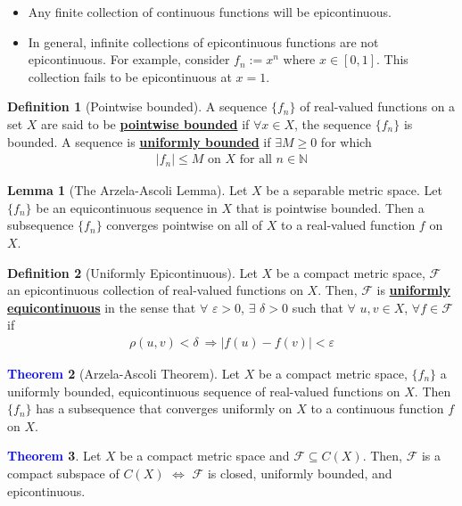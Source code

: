 \documentclass[11pt]{article}
\theoremstyle{definition}
\theoremstyle{definition}
\newcommand{\dfn}[1]{\underline{\textbf{#1}}}
\newtheorem{theorem}{\textcolor{blue}{Theorem}}
\newtheorem{lemma}[theorem]{Lemma}
\theoremstyle{definition}
\newtheorem{definition}{\textcolor{OliveGreen}{Definition}}
\theoremstyle{remark}
\begin{document}
\begin{itemize}[noitemsep]
	\item Any finite collection of continuous functions will be epicontinuous. 
	\item In general, infinite collections of epicontinuous functions are not epicontinuous. For example, consider $f_n := x^n$ where $x \in [0,1]$. This collection fails to be epicontinuous at $x=1$. 
\end{itemize}

\begin{definition}[Pointwise bounded] 
	A sequence $\{ f_n \}$ of real-valued functions on a set $X$ are said to be \dfn{pointwise bounded} if $\forall x \in X$, the sequence $\{ f_n \}$ is bounded. A sequence is \dfn{uniformly bounded} if $\exists M \geq 0$ for which 
	\begin{align*}
		| f_n | \leq M \text{ on } X \text{ for all } n \in \mathbb{N} 
	\end{align*}
\end{definition}

\begin{lemma}[The Arzela-Ascoli Lemma] 
	Let $X$ be a separable metric space. Let $\{ f_n \}$ be an equicontinuous sequence in $X$ that is pointwise bounded. Then a subsequence $\{ f_n \}$ converges pointwise on all of $X$ to a real-valued function $f$ on $X$. 
\end{lemma}

\begin{definition}[Uniformly Epicontinuous]
	Let $X$ be a compact metric space, $\mathcal{F}$ an epicontinuous collection of real-valued functions on $X$. Then, $\mathcal{F}$ is \dfn{uniformly equicontinuous} in the sense that $\forall$ $\varepsilon > 0$, $\exists$ $\delta >0$ such that $\forall $ $u, v \in X$, $\forall f \in \mathcal{F}$ if 
	\begin{align*}
		\rho (u,v) < \delta\ \Rightarrow |f(u) - f(v) | < \varepsilon
	\end{align*}
\end{definition}


\begin{theorem}[Arzela-Ascoli Theorem]
	Let $X$ be a compact metric space, $\{ f_n \}$ a uniformly bounded, equicontinuous sequence of real-valued functions on $X$. Then $\{ f_n \}$ has a subsequence that converges uniformly on $X$ to a continuous function $f$ on $X$. 
\end{theorem}

\begin{theorem}
	Let $X$ be a compact metric space and $\mathcal{F} \subseteq C(X)$. Then, $\mathcal{F}$ is a compact subspace of $C(X)$ $\iff$ $\mathcal{F}$ is closed, uniformly bounded, and epicontinuous. 
\end{theorem}
\end{document}
